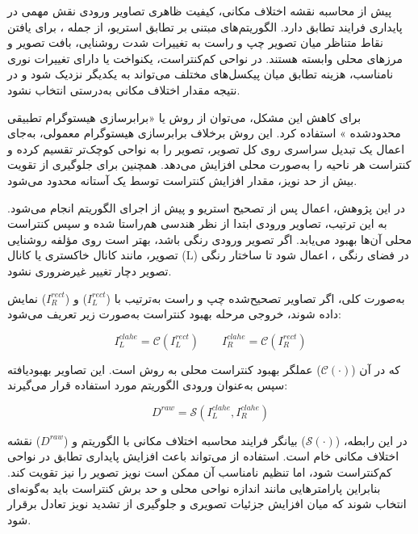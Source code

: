 پیش از محاسبه نقشه اختلاف مکانی، کیفیت ظاهری تصاویر ورودی نقش مهمی در پایداری فرایند تطابق دارد. الگوریتم‌های مبتنی بر تطابق استریو، از جمله ، برای یافتن نقاط متناظر میان تصویر چپ و راست به تغییرات شدت روشنایی، بافت تصویر و مرزهای محلی وابسته هستند. در نواحی کم‌کنتراست، یکنواخت یا دارای تغییرات نوری نامناسب، هزینه تطابق میان پیکسل‌های مختلف می‌تواند به یکدیگر نزدیک شود و در نتیجه مقدار اختلاف مکانی به‌درستی انتخاب نشود.

برای کاهش این مشکل، می‌توان از روش  یا «برابرسازی هیستوگرام تطبیقی محدودشده%
»
استفاده کرد. این روش برخلاف برابرسازی هیستوگرام معمولی، به‌جای اعمال یک تبدیل سراسری روی کل تصویر، تصویر را به نواحی کوچک‌تر تقسیم کرده و کنتراست هر ناحیه را به‌صورت محلی افزایش می‌دهد. همچنین برای جلوگیری از تقویت بیش از حد نویز، مقدار افزایش کنتراست توسط یک آستانه محدود می‌شود.

در این پژوهش، اعمال  پس از تصحیح استریو و پیش از اجرای الگوریتم  انجام می‌شود. به این ترتیب، تصاویر ورودی ابتدا از نظر هندسی هم‌راستا شده و سپس کنتراست محلی آن‌ها بهبود می‌یابد. اگر تصویر ورودی رنگی باشد، بهتر است  روی مؤلفه روشنایی تصویر، مانند کانال خاکستری یا کانال (L) در فضای رنگی ، اعمال شود تا ساختار رنگی تصویر دچار تغییر غیرضروری نشود.

به‌صورت کلی، اگر تصاویر تصحیح‌شده چپ و راست به‌ترتیب با ($I_L^{rect}$) و ($I_R^{rect}$) نمایش داده شوند، خروجی مرحله بهبود کنتراست به‌صورت زیر تعریف می‌شود:

\begin{equation}
	I_L^{clahe} = \mathcal{C}(I_L^{rect})
	\qquad
	I_R^{clahe} = \mathcal{C}(I_R^{rect})
	\label{eq:clahe_rectified_images}
\end{equation}

که در آن ($\mathcal{C}(\cdot)$) عملگر بهبود کنتراست محلی به روش  است. این تصاویر بهبودیافته سپس به‌عنوان ورودی الگوریتم  مورد استفاده قرار می‌گیرند:

\begin{equation}
	D^{raw}
	=
	\mathcal{S}
	\left(
	I_L^{clahe},
	I_R^{clahe}
	\right)
	\label{eq:sgbm_after_clahe}
\end{equation}

در این رابطه، ($\mathcal{S}(\cdot)$) بیانگر فرایند محاسبه اختلاف مکانی با الگوریتم  و ($D^{raw}$) نقشه اختلاف مکانی خام است. استفاده از  می‌تواند باعث افزایش پایداری تطابق در نواحی کم‌کنتراست شود، اما تنظیم نامناسب آن ممکن است نویز تصویر را نیز تقویت کند. بنابراین پارامترهایی مانند اندازه نواحی محلی و حد برش کنتراست باید به‌گونه‌ای انتخاب شوند که میان افزایش جزئیات تصویری و جلوگیری از تشدید نویز تعادل برقرار شود.

